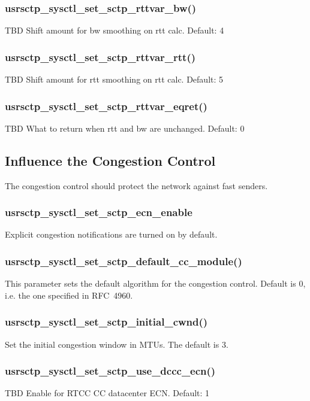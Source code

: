 \documentclass[a4paper]{article}
\begin{document}
\subsubsection{usrsctp\_sysctl\_set\_sctp\_rttvar\_bw()}
TBD
Shift amount for bw smoothing on rtt calc. Default: 4

\subsubsection{usrsctp\_sysctl\_set\_sctp\_rttvar\_rtt()}
TBD
Shift amount for rtt smoothing on rtt calc. Default: 5

\subsubsection{usrsctp\_sysctl\_set\_sctp\_rttvar\_eqret()}
TBD
What to return when rtt and bw are unchanged. Default: 0


\subsection{Influence the Congestion Control}
The congestion control should protect the network against fast senders. 

\subsubsection{usrsctp\_sysctl\_set\_sctp\_ecn\_enable}
Explicit congestion notifications are turned on by default.

\subsubsection{usrsctp\_sysctl\_set\_sctp\_default\_cc\_module()}
This parameter sets the default algorithm for the congestion control.
Default is 0, i.e. the one specified in RFC~4960.

\subsubsection{usrsctp\_sysctl\_set\_sctp\_initial\_cwnd()}
Set the initial congestion window in MTUs. The default is 3.

\subsubsection{usrsctp\_sysctl\_set\_sctp\_use\_dccc\_ecn()}
TBD
Enable for RTCC CC datacenter ECN. Default: 1
\end{document}
